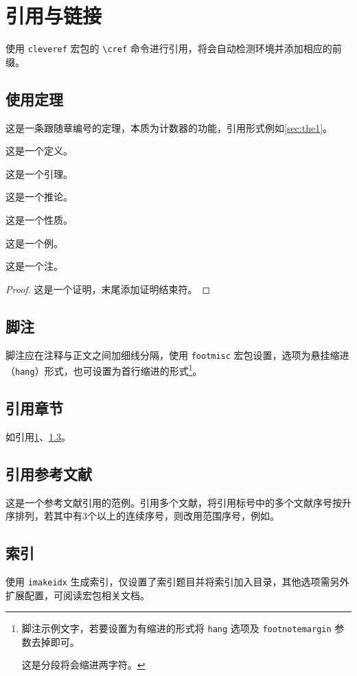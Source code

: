 
\chapter{引用与链接}\label{chap1}
使用 \lstinline{cleveref} 宏包的 \lstinline{\cref} 命令进行引用，将会自动检测环境并添加相应的前缀。

\section{使用定理}
\begin{theorem}[（这是中文括号副标题）]\label{sec:the1}
	这是一条跟随\textsf{章}编号的定理，本质为计数器的功能，引用形式例如\ref{sec:the1}。
\end{theorem}
\begin{definition}
	这是一个定义。
\end{definition}
\begin{lemma}
	这是一个引理。
\end{lemma}
\begin{corollary}
	这是一个推论。
\end{corollary}
\begin{proposition}
	这是一个性质。
\end{proposition}
\begin{example}
	这是一个例。
\end{example}
\begin{remark}
	这是一个注。
\end{remark}
\begin{proof}\pushQED{\qed}
	这是一个证明，末尾添加证明结束符。\popQED
\end{proof}

\section{脚注}
脚注应在注释与正文之间加细线分隔，使用 \lstinline{footmisc} 宏包设置，选项为悬挂缩进（\lstinline{hang}）形式，也可设置为首行缩进的形式\footnote{脚注示例文字，若要设置为有缩进的形式将 \lstinline{hang} 选项及 \lstinline{footnotemargin} 参数去掉即可。\par 这是分段将会缩进两字符。}。

\section{引用章节}\label{sec1}
如引用\cref{chap1}、\cref{sec1}。

\section{引用参考文献}
这是一个参考文献引用的范例\cite{1979Prospect}。引用多个文献，将引用标号中的多个文献序号按升序排列，若其中有3个以上的连续序号，则改用范围序号，例如\cite{1979Prospect,2004Text,1979Intracellular}。

\section{索引}
使用 \lstinline{imakeidx} 生成索引，仅设置了索引题目并将索引加入目录，其他选项需另外扩展配置，可阅读宏包相关文档。